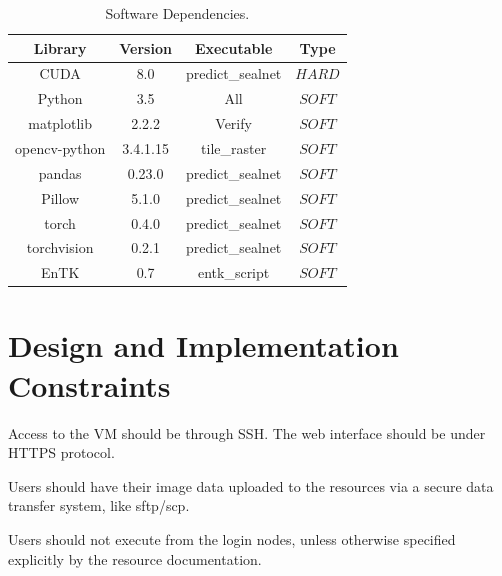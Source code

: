 \documentclass{scrreprt}
\begin{document}
\begin{table}
	\centering
	\begin{tabular}{|c|c|c|c|}
		\hline
		Library & Version & Executable & Type\\\hline
		CUDA          & 8.0      & predict\_sealnet & $HARD$\\\hline
		Python        & 3.5      & All              & $SOFT$\\\hline
		matplotlib    & 2.2.2    & Verify           & $SOFT$ \\\hline
		opencv-python & 3.4.1.15 & tile\_raster     & $SOFT$ \\\hline
		pandas        & 0.23.0   & predict\_sealnet & $SOFT$ \\\hline
		Pillow        & 5.1.0    & predict\_sealnet & $SOFT$ \\\hline
		torch         & 0.4.0    & predict\_sealnet & $SOFT$ \\\hline
		torchvision   & 0.2.1    & predict\_sealnet & $SOFT$ \\\hline
		EnTK          & 0.7      & entk\_script     & $SOFT$ \\\hline
		\hline
	\end{tabular}
	\caption{Software Dependencies.\label{tab:software_dependencies}}
\end{table}


\section{Design and Implementation Constraints}

Access to the VM should be through SSH. The web interface should be under HTTPS 
protocol.

Users should have their image data uploaded to the resources via a secure data 
transfer system, like sftp/scp.

Users should not execute from the login nodes, unless otherwise specified explicitly 
by the resource documentation.
\end{document}
